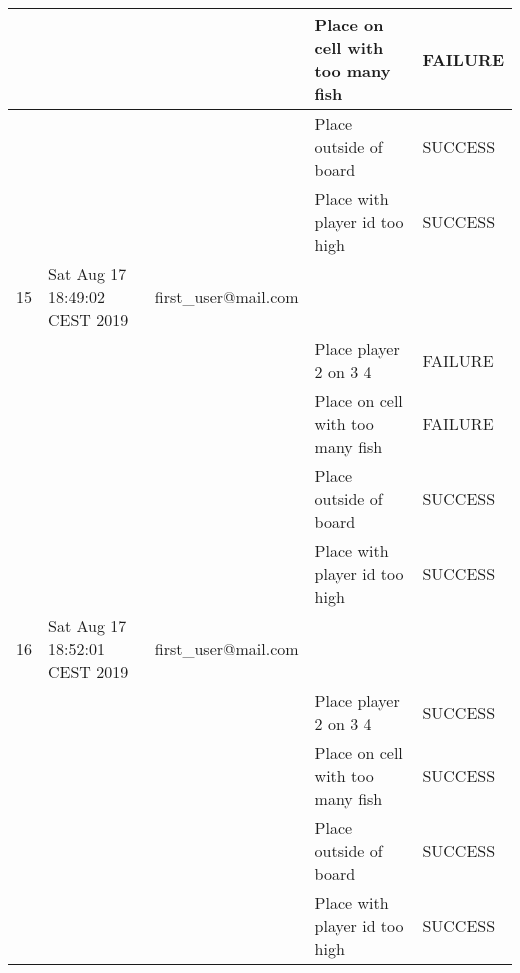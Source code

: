 \begin{center}
\begin{longtable}{|l|l|l|l|l|}
         &      &                                 & Place on cell with too many fish & FAILURE         \\ \hline
         &      &                                 & Place outside of board           & SUCCESS         \\ \hline
         &      &                                 & Place with player id too high    & SUCCESS         \\ \hline
         15 &      Sat Aug 17 18:49:02 CEST 2019 & first\_user@mail.com &                                  &                 \\ \hline
         &      &                                 & Place player 2 on 3 4            & FAILURE         \\ \hline
         &      &                                 & Place on cell with too many fish & FAILURE         \\ \hline
         &      &                                 & Place outside of board           & SUCCESS         \\ \hline
         &      &                                 & Place with player id too high    & SUCCESS         \\ \hline
         16 &      Sat Aug 17 18:52:01 CEST 2019 & first\_user@mail.com &                                  &                 \\ \hline
         &      &                                 & Place player 2 on 3 4            & SUCCESS         \\ \hline
         &      &                                 & Place on cell with too many fish & SUCCESS         \\ \hline
         &      &                                 & Place outside of board           & SUCCESS         \\ \hline
         &      &                                 & Place with player id too high    & SUCCESS         \\ \hline
    \end{longtable}
\end{center}

\normalsize